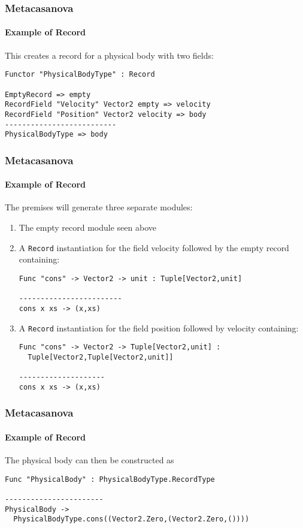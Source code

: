 \documentclass[10pt,a4paper]{beamer}
\begin{document}
\begin{frame}[fragile]
\frametitle{Metacasanova}
\framesubtitle{Example of Record}

This creates a record for a physical body with two fields:

\begin{lstlisting}
Functor "PhysicalBodyType" : Record

EmptyRecord => empty
RecordField "Velocity" Vector2 empty => velocity
RecordField "Position" Vector2 velocity => body
--------------------------
PhysicalBodyType => body
\end{lstlisting}

\end{frame}

\begin{frame}[fragile]
\frametitle{Metacasanova}
\framesubtitle{Example of Record}
The premises will generate three separate modules:

\begin{enumerate}
	\item The empty record module seen above
	\item A \texttt{Record} instantiation for the field velocity followed by the empty record containing:
	\begin{lstlisting}
Func "cons" -> Vector2 -> unit : Tuple[Vector2,unit]

------------------------
cons x xs -> (x,xs)
	\end{lstlisting}
	\item A \texttt{Record} instantiation for the field position followed by velocity containing:
	\begin{lstlisting}
Func "cons" -> Vector2 -> Tuple[Vector2,unit] : 
  Tuple[Vector2,Tuple[Vector2,unit]]

--------------------
cons x xs -> (x,xs)
	\end{lstlisting}
\end{enumerate}

\end{frame}

\begin{frame}[fragile]
\frametitle{Metacasanova}
\framesubtitle{Example of Record}

The physical body can then be constructed as

\begin{lstlisting}
Func "PhysicalBody" : PhysicalBodyType.RecordType

-----------------------
PhysicalBody -> 
  PhysicalBodyType.cons((Vector2.Zero,(Vector2.Zero,())))
\end{lstlisting}
\end{frame}
\end{document}
